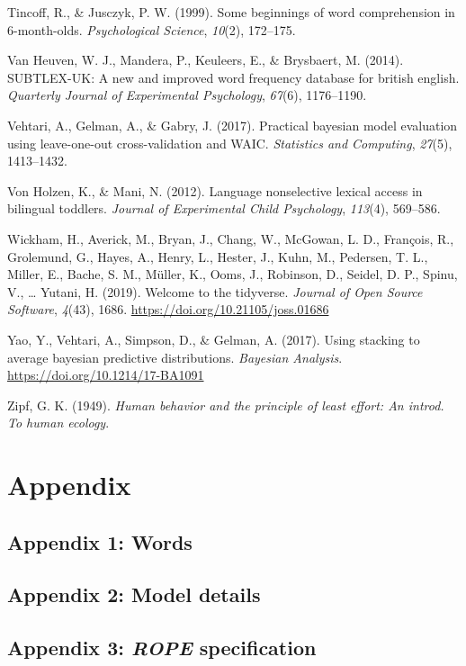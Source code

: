 \documentclass[
  letterpaper,
  DIV=11,
  numbers=noendperiod]{scrartcl}
\newlength{\cslhangindent}
\newlength{\cslentryspacingunit} %
\newenvironment{CSLReferences}[2] %
 {%
  \setlength{\parindent}{0pt}
  \ifodd #1
  \let\oldpar\par
  \def\par{\hangindent=\cslhangindent\oldpar}
  \fi
  \setlength{\parskip}{#2\cslentryspacingunit}
 }%
 {}
\begin{document}
\begin{CSLReferences}{1}{0}
\leavevmode{}%
Tincoff, R., \& Jusczyk, P. W. (1999). Some beginnings of word
comprehension in 6-month-olds. \emph{Psychological Science},
\emph{10}(2), 172--175.

\leavevmode{}%
Van Heuven, W. J., Mandera, P., Keuleers, E., \& Brysbaert, M. (2014).
SUBTLEX-UK: A new and improved word frequency database for british
english. \emph{Quarterly Journal of Experimental Psychology},
\emph{67}(6), 1176--1190.

\leavevmode{}%
Vehtari, A., Gelman, A., \& Gabry, J. (2017). Practical bayesian model
evaluation using leave-one-out cross-validation and WAIC.
\emph{Statistics and Computing}, \emph{27}(5), 1413--1432.

\leavevmode{}%
Von Holzen, K., \& Mani, N. (2012). Language nonselective lexical access
in bilingual toddlers. \emph{Journal of Experimental Child Psychology},
\emph{113}(4), 569--586.

\leavevmode{}%
Wickham, H., Averick, M., Bryan, J., Chang, W., McGowan, L. D.,
François, R., Grolemund, G., Hayes, A., Henry, L., Hester, J., Kuhn, M.,
Pedersen, T. L., Miller, E., Bache, S. M., Müller, K., Ooms, J.,
Robinson, D., Seidel, D. P., Spinu, V., \ldots{} Yutani, H. (2019).
Welcome to the {tidyverse}. \emph{Journal of Open Source Software},
\emph{4}(43), 1686. \url{https://doi.org/10.21105/joss.01686}

\leavevmode{}%
Yao, Y., Vehtari, A., Simpson, D., \& Gelman, A. (2017). Using stacking
to average bayesian predictive distributions. \emph{Bayesian Analysis}.
\url{https://doi.org/10.1214/17-BA1091}

\leavevmode{}%
Zipf, G. K. (1949). \emph{Human behavior and the principle of least
effort: An introd. To human ecology}.

\end{CSLReferences}

\hypertarget{sec-appendix}{%
\section{Appendix}\label{sec-appendix}}

\hypertarget{sec-appendix-words}{%
\subsection{Appendix 1: Words}\label{sec-appendix-words}}

\hypertarget{sec-appendix-model}{%
\subsection{Appendix 2: Model details}\label{sec-appendix-model}}

\hypertarget{sec-appendix-rope}{%
\subsection{\texorpdfstring{Appendix 3: \emph{ROPE}
specification}{Appendix 3: ROPE specification}}\label{sec-appendix-rope}}
\end{document}
